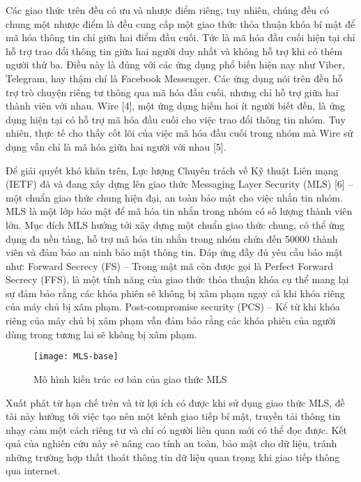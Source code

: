 \documentclass[../main-report.tex]{subfiles}
\begin{document}
Các giao thức trên đều có ưu và nhược điểm riêng, tuy nhiên, chúng đều có chung một nhược điểm là đều cung cấp một giao thức thỏa thuận khóa bí mật để mã hóa thông tin chỉ giữa hai điểm đầu cuối. Tức là mã hóa đầu cuối hiện tại chỉ hỗ trợ trao đổi thông tin giữa hai người duy nhất và không hỗ trợ khi có thêm người thứ ba. Điều này là đúng với các ứng dụng phổ biến hiện nay như Viber, Telegram, hay thậm chí là Facebook Messenger. Các ứng dụng nói trên đều hỗ trợ trò chuyện riêng tư thông qua mã hóa đầu cuối, nhưng chỉ hỗ trợ giữa hai thành viên với nhau. Wire [4], một ứng dụng hiếm hoi ít người biết đến, là ứng dụng hiện tại có hỗ trợ mã hóa đầu cuối cho việc trao đổi thông tin nhóm. Tuy nhiên, thực tế cho thấy cốt lõi của việc mã hóa đầu cuối trong nhóm mà Wire sử dụng vẫn chỉ là mã hóa giữa hai người với nhau [5]. 
	
Để giải quyết khó khăn trên, Lực lượng Chuyên trách về Kỹ thuật Liên mạng (IETF) đã và đang xây dựng lên giao thức Messaging Layer Security (MLS) [6] – một chuẩn giao thức chung hiện đại, an toàn bảo mật cho việc nhắn tin nhóm. MLS là một lớp bảo mật để mã hóa tin nhắn trong nhóm có số lượng thành viên lớn. Mục đích MLS hướng tới xây dựng một chuẩn giao thức chung, có thể ứng dụng đa nền tảng, hỗ trợ mã hóa tin nhắn trong nhóm chứa đến 50000 thành viên và đảm bảo an ninh bảo mật thông tin. Đáp ứng đầy đủ yêu cầu bảo mật như: Forward Secrecy (FS) – Trong mật mã còn được gọi là Perfect Forward Secrecy (FFS), là một tính năng của giao thức thỏa thuận khóa cụ thể mang lại sự đảm bảo rằng các khóa phiên sẽ không bị xâm phạm ngay cả khi khóa riêng của máy chủ bị xâm phạm. Post-compromise security (PCS) – Kể từ khi khóa riêng của máy chủ bị xâm phạm vẫn đảm bảo rằng các khóa phiên của người dùng trong tương lai sẽ không bị xâm phạm.

\begin{figure}[ht!]
\begin{center}
\label{fig:MLS-base}
\texttt{[image: MLS-base]}
\caption{Mô hình kiến trúc cơ bản của giao thức MLS}
\end{center}
\end{figure}

Xuất phát từ hạn chế trên và từ lợi ích có được khi sử dụng giao thức MLS, đề tài này hướng tới việc tạo nên một kênh giao tiếp bí mật, truyền tải thông tin nhạy cảm một cách riêng tư và chỉ có người liên quan mới có thể đọc được. Kết quả của nghiên cứu này sẽ nâng cao tính an toàn, bảo mật cho dữ liệu, tránh những trường hợp thất thoát thông tin dữ liệu quan trọng khi giao tiếp thông qua internet. 
\end{document}
